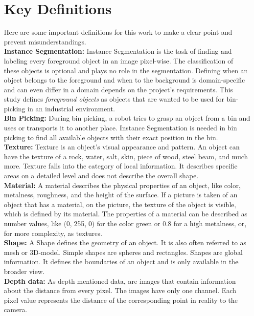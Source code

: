 	\section{Key Definitions}
	\label{sec:key-definitions}
		Here are some important definitions for this work to make a clear point and prevent misunderstandings.\\
		\textbf{Instance Segmentation:} Instance Segmentation is the task of finding and labeling every foreground object in an image pixel-wise. The classification of these objects is optional and plays no role in the segmentation. Defining when an object belongs to the foreground and when to the background is domain-specific and can even differ in a domain depends on the project's requirements. This study defines \textit{foreground objects} as objects that are wanted to be used for bin-picking in an industrial environment.\\ %
		\textbf{Bin Picking:} During bin picking, a robot tries to grasp an object from a bin and uses or transports it to another place. Instance Segmentation is needed in bin picking to find all available objects with their exact position in the bin.\\
		\textbf{Texture:} Texture is an object's visual appearance and pattern. An object can have the texture of a rock, water, salt, skin, piece of wood, steel beam, and much more. Texture falls into the category of local information. It describes specific areas on a detailed level and does not describe the overall shape.\\
		\textbf{Material:} A material describes the physical properties of an object, like color, metalness, roughness, and the height of the surface. If a picture is taken of an object that has a material, on the picture, the texture of the object is visible, which is defined by its material. The properties of a material can be described as number values, like (0, 255, 0) for the color green or 0.8 for a high metalness, or, for more complexity, as textures.\\
		\textbf{Shape:} A Shape defines the geometry of an object. It is also often referred to as mesh or 3D-model. Simple shapes are spheres and rectangles. Shapes are global information. It defines the boundaries of an object and is only available in the broader view.\\
		\textbf{Depth data:} As depth mentioned data, are images that contain information about the distance from every pixel. The images have only one channel. Each pixel value represents the distance of the corresponding point in reality to the camera.\\
